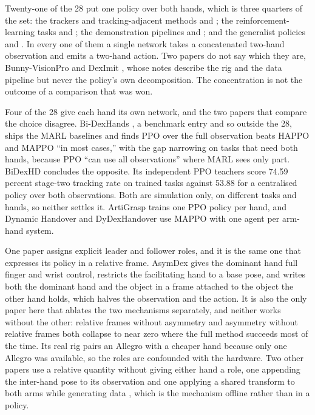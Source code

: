 Twenty-one of the 28 put one policy over both hands, which is three quarters of the set: the
trackers and tracking-adjacent methods
\cite{dexmachina_2025,dexman_2025,maniptrans_2025,objdex_2024} and \cite{humanplus_2024}; the
reinforcement-learning tasks \cite{dexpbt_2023,twisting_lids_2024,eureka_2023,pianomime_2024} and
\cite{humanoid_sim2real_recipe_2025}; the demonstration pipelines
\cite{bidex_teleop_2024,dexcap_2024,dexwild_2025,dexmimicgen_2024,hato_visuotactile_2024} and
\cite{humanoid_policy_human_policy_2025}; and the generalist policies
\cite{gr_dexter_2025,groot_n1_2025,dexora_2026,metis_2025} and \cite{egoscale_2026}. In every one
of them a single network takes a concatenated two-hand observation and emits a two-hand action.
Two papers do not say which they are, Bunny-VisionPro \cite{bunny_visionpro_2024} and DexImit
\cite{deximit_2026}, whose notes describe the rig and the data pipeline but never the policy's own
decomposition. The concentration is not the outcome of a comparison that was won.

Four of the 28 give each hand its own network, and the two papers that compare the choice
disagree. Bi-DexHands \cite{bidexhands_2022}, a benchmark entry and so outside the 28, ships the
MARL baselines and finds PPO over the full observation beats HAPPO and MAPPO ``in most cases,''
with the gap narrowing on tasks that need both hands, because PPO ``can use all observations''
where MARL sees only part. BiDexHD \cite{bidexhd_2024} concludes the opposite. Its independent PPO
teachers score 74.59 percent stage-two tracking rate on trained tasks against 53.88 for a
centralised policy over both observations. Both are simulation only, on different tasks and hands,
so neither settles it. ArtiGrasp \cite{artigrasp_2023} trains one PPO policy per hand, and Dynamic
Handover \cite{dynamic_handover_2023} and DyDexHandover \cite{dydexhandover_2025} use MAPPO with
one agent per arm-hand system.

One paper assigns explicit leader and follower roles, and it is the same one that expresses its
policy in a relative frame. AsymDex \cite{asymdex_2024} gives the dominant hand full finger and
wrist control, restricts the facilitating hand to a base pose, and writes both the dominant hand
and the object in a frame attached to the object the other hand holds, which halves the
observation and the action. It is also the only paper here that ablates the two mechanisms
separately, and neither works without the other: relative frames without asymmetry and asymmetry
without relative frames both collapse to near zero where the full method succeeds most of the
time. Its real rig pairs an Allegro with a cheaper hand because only one Allegro was available, so
the roles are confounded with the hardware. Two other papers use a relative quantity without
giving either hand a role, one appending the inter-hand pose to its observation
\cite{dexwild_2025} and one applying a shared transform to both arms while generating data
\cite{dexmimicgen_2024}, which is the mechanism offline rather than in a policy.

